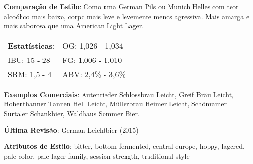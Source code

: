 \textbf{Comparação de Estilo}: Como uma German Pils ou Munich Helles com teor alcoólico mais baixo, corpo mais leve e levemente menos agressiva. Mais amarga e mais saborosa que uma American Light Lager.

\begin{tabular}{@{}p{35mm}p{35mm}@{}}
  \textbf{Estatísticas}: & OG: 1,026 - 1,034 \\
  IBU: 15 - 28  & FG: 1,006 - 1,010  \\
  SRM: 1,5 - 4  & ABV: 2,4\% - 3,6\%
\end{tabular}

\textbf{Exemplos Comerciais}: Autenrieder Schlossbräu Leicht, Greif Bräu Leicht, Hohenthanner Tannen Hell Leicht, Müllerbrau Heimer Leicht, Schönramer Surtaler Schankbier, Waldhaus Sommer Bier.

\textbf{Última Revisão}: German Leichtbier (2015)

\textbf{Atributos de Estilo}: bitter, bottom-fermented, central-europe, hoppy, lagered, pale-color, pale-lager-family, session-strength, traditional-style
